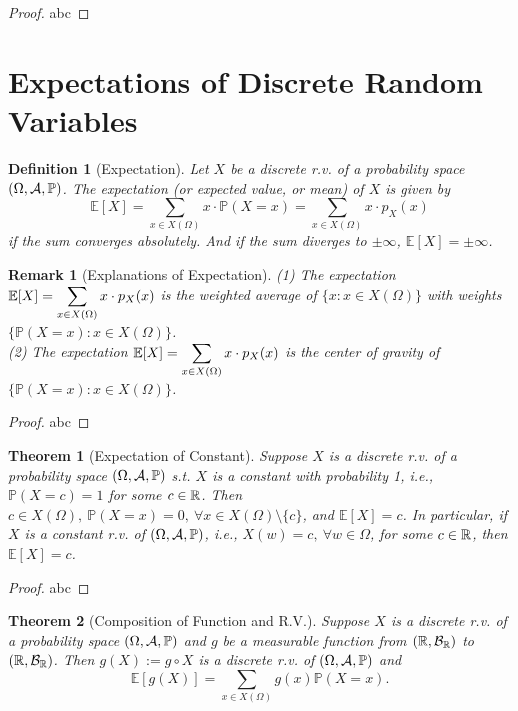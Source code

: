 \documentclass[openany,12pt]{book}
\newtheorem{theorem}{Theorem}[chapter]
\newtheorem{remark}{Remark}[chapter]
\newtheorem{definition}{Definition}[chapter]
\begin{document}
\begin{proof}
  abc
\end{proof}

\section{Expectations of Discrete Random Variables}

\begin{definition}[Expectation]
Let $X$ be a discrete r.v. of a probability space $(\Omega,\mathcal{A},\mathbb{P})$. The expectation (or expected value, or mean) of $X$ is given by 
$$
\mathbb{E}[X]=\sum_{x\in X(\Omega)}x\cdot \mathbb{P}(X=x) =\sum_{x\in X(\Omega)}x\cdot p_X (x)
$$
if the sum converges absolutely. And if the sum diverges to $\pm\infty$, $\mathbb{E}[X]=\pm\infty$.
\end{definition}

\begin{remark}[Explanations of Expectation]

(1) The expectation $\displaystyle \mathbb{E}[X]=\sum_{x\in X(\Omega)}x\cdot p_X (x)$ is the weighted average of $\{x:x\in X(\Omega)\}$ with weights $\{\mathbb{P}(X=x): x\in X(\Omega)\}$.\\
(2) The expectation $\displaystyle \mathbb{E}[X]=\sum_{x\in X(\Omega)}x\cdot p_X (x)$ is the center of gravity of $\{\mathbb{P}(X=x): x\in X(\Omega)\}$.
\end{remark}

\begin{proof}
  abc
\end{proof}

\begin{theorem}[Expectation of Constant]
Suppose $X$ is a discrete r.v. of a probability space $(\Omega,\mathcal{A},\mathbb{P})$ s.t. $X$ is a constant with probability 1, i.e., $\mathbb{P}(X=c)=1$ for some $c\in\mathbb{R}$. Then $c\in X(\Omega),\ \mathbb{P}(X=x)=0,\ \forall x\in X(\Omega)\setminus\{c\}$, and $\mathbb{E}[X]=c$. In particular, if $X$ is a constant r.v. of $(\Omega,\mathcal{A},\mathbb{P})$, i.e., $X(w)=c,\ \forall w\in\Omega$, for some $c\in\mathbb{R}$, then $\mathbb{E}[X]=c$.
\end{theorem}

\begin{proof}
  abc
\end{proof}

\begin{theorem}[Composition of Function and R.V.]
Suppose $X$ is a discrete r.v. of a probability space $(\Omega,\mathcal{A},\mathbb{P})$ and $g$ be a measurable function from $(\mathbb{R},\mathcal{B}_{\mathbb{R}})$ to $(\mathbb{R},\mathcal{B}_{\mathbb{R}})$. Then $g(X):= g\circ X$ is a discrete r.v. of $(\Omega,\mathcal{A},\mathbb{P})$ and
$$\mathbb{E}[g(X)]=\sum_{x\in X(\Omega)}g(x)\mathbb{P}(X=x).$$
\end{theorem}
\end{document}
